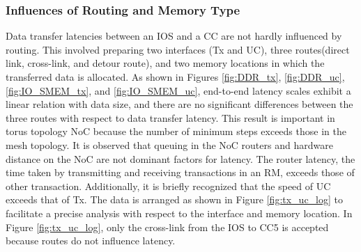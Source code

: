 \documentclass[conference,compsoc]{IEEEtran}
\newcommand{\comment}[1]{}
\begin{document}
\vspace{-3mm}
\subsubsection{Influences of Routing and Memory Type}
\label{sec:routing_and_memory}

\comment{1-20, 1-21}
Data transfer latencies between an IOS and a CC are not hardly influenced by routing.
This involved preparing two interfaces (Tx and UC), three routes(direct link, cross-link, and detour route), and two memory locations in which the transferred data is allocated.
As shown in Figures \ref{fig:DDR_tx}, \ref{fig:DDR_uc}, \ref{fig:IO_SMEM_tx}, and \ref{fig:IO_SMEM_uc}, 
end-to-end latency scales exhibit a linear relation with data size, and there are no significant differences between the three routes with respect to data transfer latency.
This result is important in torus topology NoC because the number of minimum steps exceeds those in the mesh topology. 
It is observed that queuing in the NoC routers and hardware distance on the NoC are not dominant factors for latency.
The router latency, the time taken by transmitting and receiving transactions in an RM, exceeds those of other transaction.
Additionally, it is briefly recognized that the speed of UC exceeds that of Tx.
The data is arranged as shown in Figure \ref{fig:tx_uc_log} to facilitate a precise analysis with respect to the interface and memory location.
In Figure \ref{fig:tx_uc_log}, only the cross-link from the IOS to CC5 is accepted because routes do not influence latency.
\end{document}
